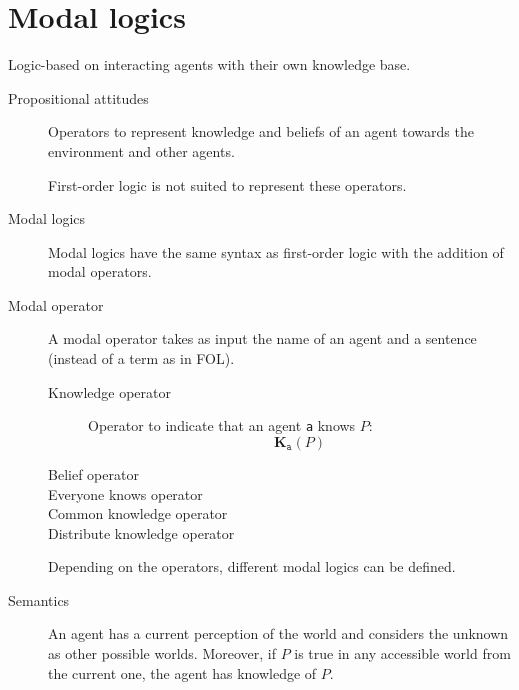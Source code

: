 


\section{Modal logics}

Logic-based on interacting agents with their own knowledge base.

\begin{description}
    \item[Propositional attitudes] 
        Operators to represent knowledge and beliefs of an agent towards the environment and other agents.

        First-order logic is not suited to represent these operators.

    \item[Modal logics] 
        Modal logics have the same syntax as first-order logic with the addition of modal operators.

    \item[Modal operator]
        A modal operator takes as input the name of an agent and a sentence (instead of a term as in FOL).
        
        \begin{description}
            \item[Knowledge operator] 
                Operator to indicate that an agent \texttt{a} knows $P$:
                \[ \textbf{K}_\texttt{a}(P) \]

            \item[Belief operator]
            \item[Everyone knows operator]
            \item[Common knowledge operator]
            \item[Distribute knowledge operator]
        \end{description}

        Depending on the operators, different modal logics can be defined.

    \item[Semantics]
        An agent has a current perception of the world and considers the unknown as other possible worlds.
        Moreover, if $P$ is true in any accessible world from the current one, the agent has knowledge of $P$.


\end{description}

